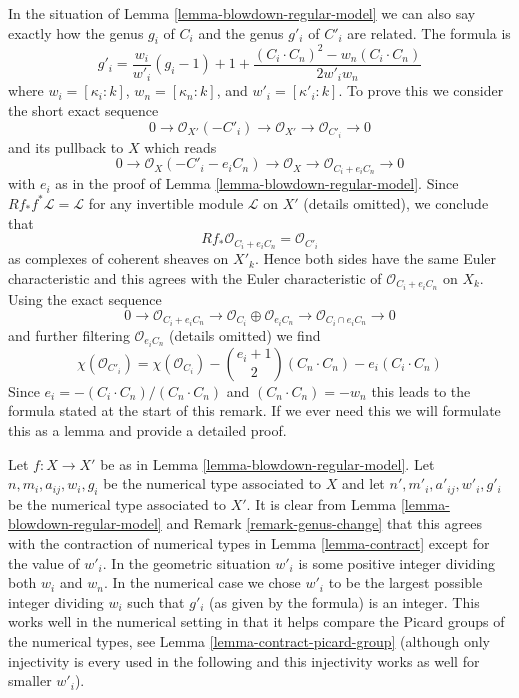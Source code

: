 \begin{remark}
\label{remark-genus-change}
In the situation of Lemma \ref{lemma-blowdown-regular-model}
we can also say exactly how the genus $g_i$ of $C_i$ and the genus
$g'_i$ of $C'_i$ are related. The formula is
$$
g'_i = \frac{w_i}{w'_i}(g_i - 1) + 1 +
\frac{(C_i \cdot C_n)^2 - w_n(C_i \cdot C_n)}{2w'_iw_n}
$$
where $w_i = [\kappa_i : k]$, $w_n = [\kappa_n : k]$, and
$w'_i = [\kappa'_i : k]$.
To prove this we consider the short exact sequence
$$
0 \to \mathcal{O}_{X'}(-C'_i) \to \mathcal{O}_{X'} \to
\mathcal{O}_{C'_i} \to 0
$$
and its pullback to $X$ which reads
$$
0 \to \mathcal{O}_X(-C'_i - e_iC_n) \to \mathcal{O}_X \to
\mathcal{O}_{C_i + e_i C_n} \to 0
$$
with $e_i$ as in the proof of Lemma \ref{lemma-blowdown-regular-model}.
Since $Rf_*f^*\mathcal{L} = \mathcal{L}$ for any invertible module
$\mathcal{L}$ on $X'$ (details omitted), we conclude that
$$
Rf_*\mathcal{O}_{C_i + e_i C_n} = \mathcal{O}_{C'_i}
$$
as complexes of coherent sheaves on $X'_k$.
Hence both sides have the same Euler characteristic and this
agrees with the Euler characteristic of $\mathcal{O}_{C_i + e_i C_n}$
on $X_k$. Using the exact sequence
$$
0 \to \mathcal{O}_{C_i + e_i C_n} \to
\mathcal{O}_{C_i} \oplus \mathcal{O}_{e_iC_n} \to
\mathcal{O}_{C_i \cap e_iC_n} \to 0
$$
and further filtering $\mathcal{O}_{e_iC_n}$ (details omitted) we find
$$
\chi(\mathcal{O}_{C'_i}) =
\chi(\mathcal{O}_{C_i}) - {e_i + 1 \choose 2}(C_n \cdot C_n)
- e_i(C_i \cdot C_n)
$$
Since $e_i = -(C_i \cdot C_n)/(C_n \cdot C_n)$ and
$(C_n \cdot C_n) = -w_n$ this leads to the formula
stated at the start of this remark. If we ever need
this we will formulate this as a lemma and
provide a detailed proof.
\end{remark}

\begin{remark}
\label{remark-compare-contractions}
Let $f : X \to X'$ be as in Lemma \ref{lemma-blowdown-regular-model}.
Let $n, m_i, a_{ij}, w_i, g_i$ be the numerical type associated to $X$ and
let $n', m'_i, a'_{ij}, w'_i, g'_i$ be the numerical type associated to $X'$.
It is clear from Lemma \ref{lemma-blowdown-regular-model} and
Remark \ref{remark-genus-change}
that this agrees with the contraction of numerical types in
Lemma \ref{lemma-contract}
except for the value of $w'_i$.
In the geometric situation $w'_i$ is some positive integer
dividing both $w_i$ and $w_n$. In the numerical case
we chose $w'_i$ to be the largest possible integer dividing
$w_i$ such that $g'_i$ (as given by the formula) is an integer.
This works well in the numerical setting
in that it helps compare the Picard groups
of the numerical types, see Lemma \ref{lemma-contract-picard-group}
(although only injectivity is every used in the following and this
injectivity works as well for smaller $w'_i$).
\end{remark}





